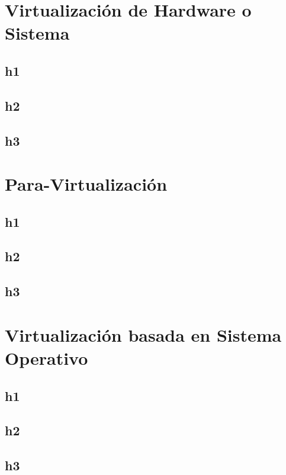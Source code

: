 \section{Virtualización de Hardware o Sistema}
\subsection{h1}
\subsection{h2}
\subsection{h3}

\section{Para-Virtualización}
\subsection{h1}
\subsection{h2}
\subsection{h3}

\section{Virtualización basada en Sistema Operativo}
\subsection{h1}
\subsection{h2}
\subsection{h3}